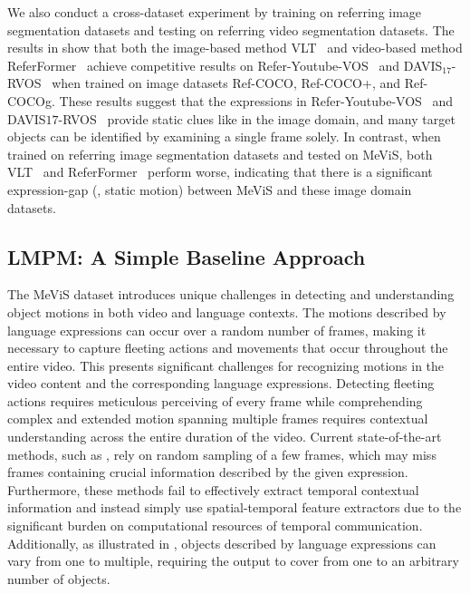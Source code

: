 \documentclass[10pt,twocolumn,letterpaper]{article}
\newcommand{\ourdataset}{MeViS\xspace}
\newcommand{\ourmodel}{LMPM\xspace}
\begin{document}
We also conduct a cross-dataset experiment by training on referring image segmentation datasets and testing on referring video segmentation datasets. The results in  show that both the image-based method VLT~\cite{vltpami} and video-based method ReferFormer~\cite{wu2022referformer} achieve competitive results on Refer-Youtube-VOS~\cite{seo2020urvos} and DAVIS$_{17}$-RVOS~\cite{khoreva2018video} when trained on image datasets Ref-COCO, Ref-COCO+, and Ref-COCOg. These results suggest that the expressions in Refer-Youtube-VOS~\cite{seo2020urvos} and DAVIS${17}$-RVOS~\cite{khoreva2018video} provide static clues like in the image domain, and many target objects can be identified by examining a single frame solely. In contrast, when trained on referring image segmentation datasets and tested on \ourdataset, both VLT~\cite{vltpami} and ReferFormer~\cite{wu2022referformer} perform worse, indicating that there is a significant expression-gap (\eg, static \vs motion) between \ourdataset and these image domain datasets.


\subsection{\ourmodel: A Simple Baseline Approach}\label{sec:L-TAM}

The \ourdataset dataset introduces unique challenges in detecting and understanding object motions in both video and language contexts. The motions described by language expressions can occur over a random number of frames, making it necessary to capture fleeting actions and movements that occur throughout the entire video. This presents significant challenges for recognizing motions in the video content and the corresponding language expressions. Detecting fleeting actions requires meticulous perceiving of every frame while comprehending complex and extended motion spanning multiple frames requires contextual understanding across the entire duration of the video. Current state-of-the-art methods, such as \cite{wu2022referformer,MTTR,Ding_2022_CVPR}, rely on random sampling of a few frames, which may miss frames containing crucial information described by the given expression. Furthermore, these methods fail to effectively extract temporal contextual information and instead simply use spatial-temporal feature extractors due to the significant burden on computational resources of temporal communication. Additionally, as illustrated in , objects described by language expressions can vary from one to multiple, requiring the output to cover from one to an arbitrary number of objects.
\end{document}
